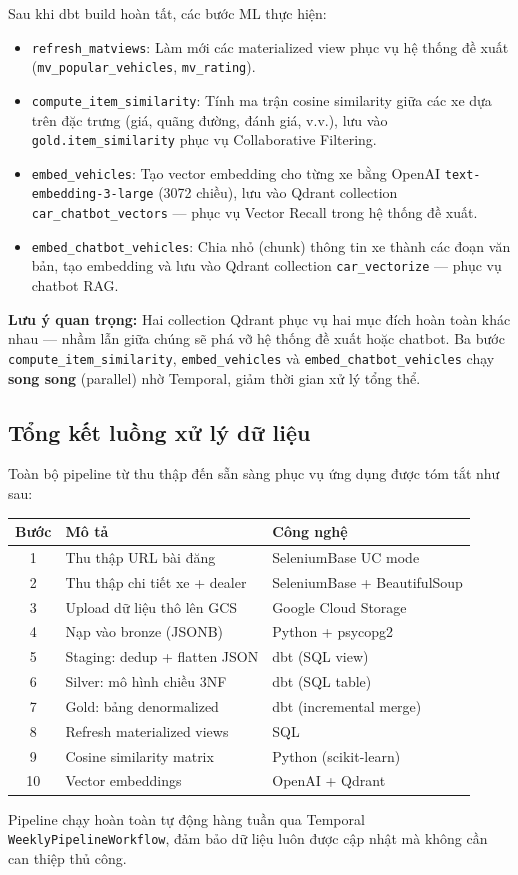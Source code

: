 Sau khi dbt build hoàn tất, các bước ML thực hiện:

\begin{itemize}
    \item \texttt{refresh\_matviews}: Làm mới các materialized view phục vụ hệ thống đề xuất (\texttt{mv\_popular\_vehicles}, \texttt{mv\_rating}).
    \item \texttt{compute\_item\_similarity}: Tính ma trận cosine similarity giữa các xe dựa trên đặc trưng (giá, quãng đường, đánh giá, v.v.), lưu vào \texttt{gold.item\_similarity} phục vụ Collaborative Filtering.
    \item \texttt{embed\_vehicles}: Tạo vector embedding cho từng xe bằng OpenAI \texttt{text-embedding-3-large} (3072 chiều), lưu vào Qdrant collection \texttt{car\_chatbot\_vectors} — phục vụ Vector Recall trong hệ thống đề xuất.
    \item \texttt{embed\_chatbot\_vehicles}: Chia nhỏ (chunk) thông tin xe thành các đoạn văn bản, tạo embedding và lưu vào Qdrant collection \texttt{car\_vectorize} — phục vụ chatbot RAG.
\end{itemize}

\textbf{Lưu ý quan trọng:} Hai collection Qdrant phục vụ hai mục đích hoàn toàn khác nhau — nhầm lẫn giữa chúng sẽ phá vỡ hệ thống đề xuất hoặc chatbot. Ba bước \texttt{compute\_item\_similarity}, \texttt{embed\_vehicles} và \texttt{embed\_chatbot\_vehicles} chạy \textbf{song song} (parallel) nhờ Temporal, giảm thời gian xử lý tổng thể.

\subsection{Tổng kết luồng xử lý dữ liệu}

Toàn bộ pipeline từ thu thập đến sẵn sàng phục vụ ứng dụng được tóm tắt như sau:

\begin{center}
\small
\begin{tabular}{|c|l|l|}
\hline
\textbf{Bước} & \textbf{Mô tả} & \textbf{Công nghệ} \\
\hline
1 & Thu thập URL bài đăng & SeleniumBase UC mode \\
\hline
2 & Thu thập chi tiết xe + dealer & SeleniumBase + BeautifulSoup \\
\hline
3 & Upload dữ liệu thô lên GCS & Google Cloud Storage \\
\hline
4 & Nạp vào bronze (JSONB) & Python + psycopg2 \\
\hline
5 & Staging: dedup + flatten JSON & dbt (SQL view) \\
\hline
6 & Silver: mô hình chiều 3NF & dbt (SQL table) \\
\hline
7 & Gold: bảng denormalized & dbt (incremental merge) \\
\hline
8 & Refresh materialized views & SQL \\
\hline
9 & Cosine similarity matrix & Python (scikit-learn) \\
\hline
10 & Vector embeddings & OpenAI + Qdrant \\
\hline
\end{tabular}
\end{center}

Pipeline chạy hoàn toàn tự động hàng tuần qua Temporal \texttt{WeeklyPipelineWorkflow}, đảm bảo dữ liệu luôn được cập nhật mà không cần can thiệp thủ công.
